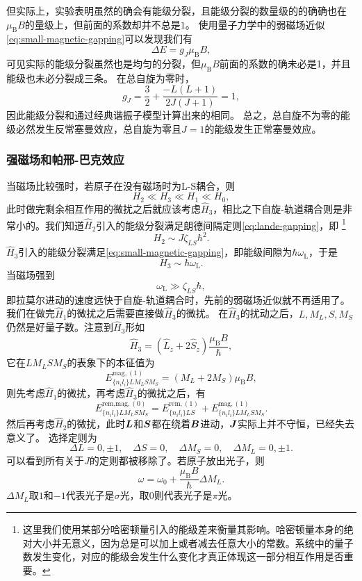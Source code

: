 \documentclass[UTF8, a4paper]{ctexart}
\begin{document}
但实际上，实验表明虽然的确会有能级分裂，且能级分裂的数量级的的确确也在$\mu_\text{B} B$的量级上，但前面的系数却并不总是$1$。
使用量子力学中的弱磁场近似\eqref{eq:small-magnetic-gapping}可以发现我们有
\begin{equation}
    \Delta E = g_J \mu_\text{B} B,
\end{equation}
可见实际的能级分裂虽然也是均匀的分裂，但$\mu_\text{B} B$前面的系数的确未必是1，并且能级也未必分裂成三条。
在总自旋为零时，
\[
    g_J = \frac{3}{2} + \frac{-L(L+1)}{2J(J+1)} = 1,
\]
因此能级分裂和通过经典谐振子模型计算出来的相同。
总之，总自旋不为零的能级必然发生反常塞曼效应，总自旋为零且$J=1$的能级发生正常塞曼效应。

\subsubsection{强磁场和帕邢-巴克效应}

当磁场比较强时，若原子在没有磁场时为L-S耦合，则
\begin{equation}
    {H}_2 \ll {H}_3 \ll {H}_1 \ll {H}_0,
\end{equation}
此时做完剩余相互作用的微扰之后就应该考虑$\hat{H}_3$，相比之下自旋-轨道耦合则是非常小的。我们知道$\hat{H}_2$引入的能级分裂满足朗德间隔定则\eqref{eq:lande-gapping}，即%
\footnote{这里我们使用某部分哈密顿量引入的能级差来衡量其影响。哈密顿量本身的绝对大小并无意义，因为总是可以加上或者减去任意大小的常数。系统中的量子数发生变化，对应的能级会发生什么变化才真正体现这一部分相互作用是否重要。}%
\[
    H_2 \sim J \zeta_{LS} \hbar^2.
\]
$\hat{H}_3$引入的能级分裂满足\eqref{eq:small-magnetic-gapping}，即能级间隙为$\hbar \omega_\text{L}$，于是
\[
    H_3 \sim \hbar \omega_\text{L}.
\]
当磁场强到
\begin{equation}
    \omega_\text{L} \gg \zeta_{LS} \hbar,
\end{equation}
即拉莫尔进动的速度远快于自旋-轨道耦合时，先前的弱磁场近似就不再适用了。
我们在做完$\hat{H}_1$的微扰之后需要直接做$\hat{H}_3$的微扰。
在$\hat{H}_3$的扰动之后，$L, M_L, S, M_S$仍然是好量子数。注意到$\hat{H}_3$形如
\[
    \hat{H}_3 = (\hat{L}_z + 2 \hat{S}_z) \frac{\mu_\text{B} B}{\hbar}, 
\]
它在$L M_L S M_S$的表象下的本征值为
\begin{equation}
    E^{\text{mag}, (1)}_{\{n_i l_i\} L M_L S M_S} = (M_L + 2 M_S) \mu_\text{B} B,
\end{equation}
则先考虑$\hat{H}_1$的微扰，再考虑$\hat{H}_3$的微扰之后，有
\[
    E^{\text{rem,mag}, (0)}_{\{n_i l_i\} L M_L S M_S} = E^{\text{rem}, (1)}_{\{n_i l_i\} LS} + E^{\text{mag}, (1)}_{\{n_i l_i\} L M_L S M_S}.
\]
然后再考虑$\hat{H}_2$的微扰，此时$\vb*{L}$和$\vb*{S}$都在绕着$\vb*{B}$进动，$\vb*{J}$实际上并不守恒，已经失去意义了。
选择定则为
\begin{equation}
    \Delta L = 0, \pm 1, \quad \Delta S = 0, \quad \Delta M_S = 0, \quad \Delta M_L = 0, \pm 1.
\end{equation}
可以看到所有关于$J$的定则都被移除了。若原子放出光子，则
\begin{equation}
    \omega = \omega_0 + \frac{\mu_\text{B} B}{\hbar} \Delta M_L.
\end{equation}
$\Delta M_L$取$1$和$-1$代表光子是$\sigma$光，取$0$则代表光子是$\pi$光。
\end{document}
